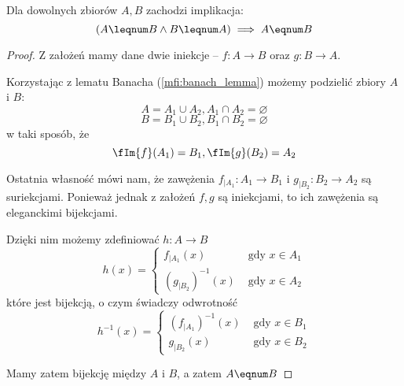 \begin{theorem}
	Dla dowolnych zbiorów \( A, B \) zachodzi implikacja:
	\[
		(A \leqnum B \land B \leqnum A) \implies A \eqnum B
	\]
\end{theorem}
\begin{proof}
	Z założeń mamy dane dwie iniekcje -- \( f: A \rightarrow B \) oraz \( g: B \rightarrow A \).

	Korzystając z lematu Banacha (\ref{mfi:banach_lemma}) możemy podzielić zbiory \(A\) i \(B\):
	\[
		A = A_1 \cup A_2, A_1 \cap A_2 = \varnothing
	\]
	\[
		B = B_1 \cup B_2, B_1 \cap B_2 = \varnothing
	\]
	w taki sposób, że
	\[
		\fIm{f}(A_1) = B_1, \fIm{g}(B_2) = A_2
	\]

	Ostatnia własność mówi nam, że zawężenia \( f_{\mid A_1} : A_1 \rightarrow B_1 \) i  \( g_{\mid B_2} : B_2 \rightarrow A_2 \) są suriekcjami.
	Ponieważ jednak z założeń \( f, g \) są iniekcjami, to ich zawężenia są eleganckimi bijekcjami.

	Dzięki nim możemy zdefiniować \( h: A \rightarrow B \)
	\[
		h(x) = \begin{cases}
			f_{\mid A_1}(x)        & \text{ gdy } x \in A_1 \\
			(g_{\mid B_2})^{-1}(x) & \text{ gdy } x \in A_2
		\end{cases}
	\]
	które jest bijekcją, o czym świadczy odwrotność
	\[
		h^{-1}(x) = \begin{cases}
			(f_{\mid A_1})^{-1}(x) & \text{ gdy } x \in B_1 \\
			g_{\mid B_2}(x)        & \text{ gdy } x \in B_2
		\end{cases}
	\]

	Mamy zatem bijekcję między \( A \) i \( B \), a zatem \( A \eqnum B \)


\end{proof}
